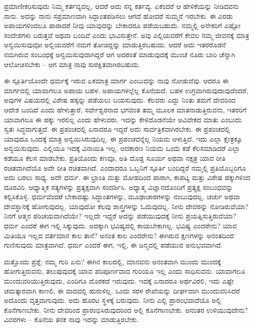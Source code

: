 ಪ್ರಮಾಣೀಕರಿಸುವುದು ನಿಮ್ಮ ಕರ್ತವ್ಯವಲ್ಲ, ಆದರೆ ಅದು ನನ್ನ ಕರ್ತವ್ಯ. ಏಕೆಂದರೆ ಆ ಹೇಳಿಕೆಯನ್ನು ನೀಡಿದವನು ನಾನು. ಅದನ್ನು ನಾನು ಸಪ್ರಮಾಣವಾಗಿ ಸಿದ್ದಾಂತಪಡಿಸಲು ಆಗದೆ ಹೋದರೆ ಸುಮ್ಮನೆ ಇರಬೇಕು. ಈ ಎರಡು ಅಪಾಯಗಳಿಂದಲೂ ಪಾರಾದರೆ ನೀವು ಯಾವುದನ್ನು ಬೇಕಾದರೂ ಪಡೆಯಬಹುದು. ನಮ್ಮಲ್ಲಿ ಅನೇಕರಿಗೆ ಎಷ್ಟೋ ಸಂದೇಶಗಳು ಬರುತ್ತವೆ ಅಥವಾ ಬಂದಿವೆ ಎಂದು ಭಾವಿಸುತ್ತೇನೆ. ಅವು ಎಲ್ಲಿಯವರೆಗೆ ಕೇವಲ ನಮ್ಮ ಜೀವನಕ್ಕೆ ಮಾತ್ರ ಅನ್ವಯಿಸುವುವೋ ಅಲ್ಲಿಯವರೆಗೆ ನಮಗೆ ತೋಚಿದ್ದನ್ನು ಮಾಡುತ್ತಿರಬಹುದು. ಆದರೆ ಅದು ಇತರರೊಡನೆ ನಮಗಿರುವ ಸಂಬಂಧಕ್ಕೆ ಅನ್ವಯಿಸುವುದಾಗಿದ್ದರೆ ಆಗ ಅದರಂತೆ ಮಾಡುವುದಕ್ಕೆ ಮುಂಚೆ ನೂರು ಬಾರಿ ಚೆನ್ನಾಗಿ ಆಲೋಚಿಸಬೇಕು – ಆಗ ಮಾತ್ರ ನಾವು ಸುರಕ್ಷಿತವಾಗಿರಬಹುದು.

ಈ ಸ್ಪೂರ್ತಿಯೊಂದೇ ಧರ್ಮಕ್ಕೆ ಇರುವ ಏಕಮಾತ್ರ ಮಾರ್ಗ ಎಂಬುದನ್ನು ನಾವು ನೋಡುವೆವು. ಆದರೂ ಈ ಮಾರ್ಗದಲ್ಲಿ ಯಾವಾಗಲೂ ಅಪಾಯ ಬಹಳ. ಅಪಾಯಗಳಲ್ಲೆಲ್ಲ ಕೊನೆಯದೆ, ಬಹಳ ಉಗ್ರವಾಗಿರುವುದಾವುದೆಂದರೆ, ಅವುಗಳ ವಿಷಯದಲ್ಲಿ ವಿಶೇಷ ಹಕ್ಕನ್ನು ಪಡೆಯಲು ಬಯಸುವುದು. ಕೆಲವರು ಎದ್ದು ನಿಂತು ತಮಗೆ ದೇವರಿಂದ ಆದೇಶ ಬಂದಿದೆ ಎಂದು ಹೇಳುತ್ತಾರೆ, ಸರ್ವೇಶ್ವರನಾದ ಭಗವಂತ ತಮ್ಮ ಮೂಲಕ ಮಾತನಾಡುತ್ತಿರುವನು, ಇತರರಿಗೆ ಯಾವಾಗಲೂ ಈ ಹಕ್ಕು ಇರಲಿಲ್ಲ ಎಂದು ಹೇಳುವರು. ಇದನ್ನು ಕೇಳಿದೊಡನೆಯೇ ಅವಿವೇಕದ ಮಾತು ಎಂಬುದು ಸ್ವತಃ ಸಿದ್ಧವಾಗುತ್ತದೆ. ಈ ಪ್ರಪಂಚದಲ್ಲಿ ಏನಾದರೂ ಇದ್ದರೆ ಅದು ಸಾರ್ವತ್ರಿಕವಾಗಿರಬೇಕು. ಈ ಪ್ರಪಂಚದಲ್ಲಿ ಯಾವುದೂ ಒಂದಕ್ಕೆ ಮಾತ್ರ ಅನ್ವಯಿಸಿರುವುದಿಲ್ಲ. ಈ ಪ್ರಪಂಚವನ್ನೆಲ್ಲ ನಿಯಮ ಆಳುತ್ತಿದೆ. ಇದು ಎಲ್ಲಾ ಕ್ಷೇತ್ರಕ್ಕೂ ಅನ್ವಯಿಸುವುದು. ಎಲ್ಲಿಯೂ ಇದಕ್ಕೆ ವಿನಾಯಿತಿ ಇಲ್ಲ. ಆದಕಾರಣ ನಿಯಮ ಒಂದು ಕಡೆ ಕೆಲಸಮಾಡಿದರೆ ಎಲ್ಲಾ ಕಡೆಯೂ ಕೆಲಸ ಮಾಡಬೇಕು. ಪ್ರತಿಯೊಂದು ಕಣವೂ, ಅತಿ ದೊಡ್ಡ ಸೂರ್ಯ ಅಥವಾ ನಕ್ಷತ್ರ ಯಾವ ರೀತಿ ರಚಿತವಾಗಿದೆಯೊ ಅದೇ ರೀತಿ ರಚಿತವಾಗಿದೆ. ಎಂದಾದರೂ ಒಬ್ಬನಿಗೆ ಸ್ಪೂರ್ತಿ ಬಂದಿದ್ದರೆ ನಮ್ಮಲ್ಲಿ ಪ್ರತಿಯೊಬ್ಬರಿಗೂ ಅದು ಬರಲು ಸಾಧ್ಯ. ಅದೇ ಧರ್ಮ. ಈ ಭ್ರಾಂತಿ ಮತ್ತು ಮೋಹದಿಂದ ಪಾರಾಗಿ, ಕಾಪಟ್ಯ ಮತ್ತು ವಿಶೇಷ ಹಕ್ಕುಗಳಿಂದ ದೂರವಿರಿ. ಆಧ್ಯಾತ್ಮಿಕ ಸತ್ಯಗಳನ್ನು ಪ್ರತ್ಯಕ್ಷವಾಗಿ ಸಂದರ್ಶಿಸಿ. ಅಧ್ಯಾತ್ಮ ವಿಜ್ಞಾನದೊಂದಿಗೆ ಪ್ರತ್ಯಕ್ಷ ಸಂಬಂಧವನ್ನು ಕಲ್ಪಿಸಿಕೊಳ್ಳಿ. ಧರ್ಮವೆಂದರೆ ಬೇಕಾದಷ್ಟು ಸಿದ್ಧಾಂತಗಳನ್ನು, ಮೂಢಾಚಾರಗಳನ್ನು ನಂಬುವುದಲ್ಲ. ಚರ್ಚು ಅಥವಾ ದೇವಸ್ಥಾನಕ್ಕೆ ಹೋಗುವುದಲ್ಲ. ಯಾವುದೋ ಕೆಲವು ಶಾಸ್ತ್ರಗಳನ್ನು ಓದುವುದಲ್ಲ. ನೀನು ದೇವರನ್ನು ನೋಡಿರುವೆಯಾ? ನಿನಗೆ ಆತ್ಮನ ಪರಿಚಯವಾಗಿದೆಯೇ? ಇಲ್ಲದೇ ಇದ್ದರೆ ಅದನ್ನು ಪಡೆಯುವುದಕ್ಕೆ ನೀನು ಪ್ರಯತ್ನಿಸುತ್ತಿರುವೆಯಾ? ಧರ್ಮ ಎಂದರೆ ಈಗ ಇಲ್ಲಿ ಸಿಕ್ಕುವುದು. ಅದಕ್ಕಾಗಿ ಭವಿಷ್ಯದಲ್ಲಿ ಕಾಯಬೇಕಾಗಿಲ್ಲ. ಭವಿಷ್ಯ ಎಂದರೇನು? ಯಾವ ಮಿತಿಯೂ ಇಲ್ಲದ ವರ್ತಮಾನ ಕಾಲ ತಾನೆ? ಅನಂತ ಕಾಲ ಎಂದರೇನು? ಈಗಿರುವ ಕ್ಷಣಗಳನ್ನು ಅನಂತದಿಂದ ಗುಣಿಸುವುದು ಮಾತ್ರವಾಗಿದೆ. ಧರ್ಮ ಎಂದರೆ ಈಗ, ಇಲ್ಲಿ, ಈ ಜನ್ಮದಲ್ಲಿ ಪಡೆಯುವ ಅನುಭವವಾಗಿದೆ.

ಮತ್ತೊಂದು ಪ್ರಶ್ನೆ: ನಮ್ಮ ಗುರಿ ಏನು? ಈಗಿನ ಕಾಲದಲ್ಲಿ, ಮಾನವನು ಅನಂತವಾಗಿ ಮುಂದು ಮುಂದಕ್ಕೆ ಹೋಗುತ್ತಿರುವನು, ತಲುಪುವುದಕ್ಕೆ ಯಾವ ಪರಿಪೂರ್ಣವಾದ ಗುರಿಯೂ ಇಲ್ಲ ಎಂದು ಸಾಧಿಸುವನು. ಯಾವಾಗಲೂ ಮುಂದುವರಿಯುತ್ತಿರುವುದು, ಎಂದಿಗೂ ದೊರಕದೆ ಇರುವುದು. ಇದಕ್ಕೆ ಏನಾದರೂ ಅರ್ಥವಿರಲಿ, ಇದು ಎಷ್ಟೇ ಚಮತ್ಕಾರವಾಗಿ ಕಾಣಲಿ, ಈ ವಾದದಲ್ಲಿ ಹುರುಳಿಲ್ಲ. ಒಂದು ಸರಳ ರೇಖೆಯನ್ನು ದೀರ್ಘವಾಗಿ ಮುಂದುವರಿಸಿದರೆ ಅದೊಂದು ವೃತ್ತವಾಗುವುದು. ಅದು ಹೊರಟ ಸ್ಥಳಕ್ಕೆ ಬರುವುದು. ನೀನು ಎಲ್ಲಿ ಪ್ರಾರಂಭವಾದೆಯೊ ಅಲ್ಲಿ ಕೊನೆಗಾಣಬೇಕು. ನೀನು ದೇವರಿಂದ ಪ್ರಾರಂಭಿಸಿರುವುದರಿಂದ ಅಲ್ಲಿ ಕೊನೆಗಾಣಬೇಕು. ಅನಂತರ ಉಳಿಯುವುದೇನು? ವಿವರಗಳು – ಕೊನೆಯ ತನಕ ನಾವು ಇದನ್ನು ಮಾಡುತ್ತಿರಬೇಕು.

